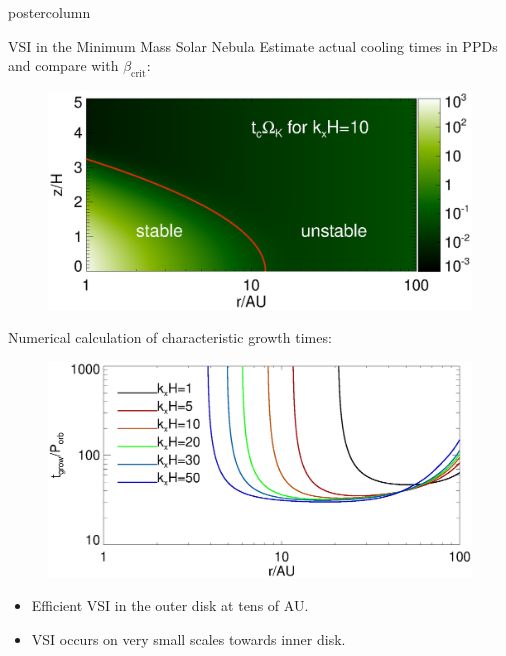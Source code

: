 \documentclass[final,hyperref={pdfpagelabels=false}]{beamer}
\begin{document}
\begin{frame}
\begin{columns}
\begin{column}{.49\textwidth}
\begin{beamercolorbox}[center,wd=\textwidth]{postercolumn}
\begin{minipage}[T]{.95\textwidth}
{              \begin{block}{{\Large VSI in the Minimum Mass Solar Nebula}}
                \justifying
                Estimate actual cooling times in PPDs and compare with
                $\beta_\mathrm{crit}$:\\
                \vspace{-1cm}
                \begin{figure}
                  \includegraphics[width=\linewidth]{figures/bcrit_mmsn2d.ps}
                \end{figure}
                Numerical calculation of characteristic growth
                times:\\
                \vspace{-1cm}
                \begin{figure}
                  \includegraphics[width=\linewidth]{figures/eigen_compare_grow.ps}
                \end{figure}
                \begin{itemize}
                \item Efficient VSI in the outer disk at tens of AU. 
                \item VSI occurs on very small scales towards inner disk.
                \end{itemize}
              \end{block}
            \vfill
            
}
\end{minipage}
\end{beamercolorbox}
\end{column}
\end{columns}
\end{frame}
\end{document}
